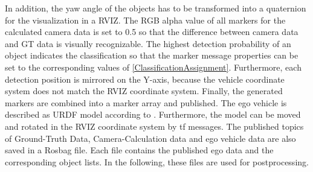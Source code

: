In addition, the yaw angle of the objects has to be transformed into a quaternion for the visualization in a \ac{RVIZ}. The RGB alpha value of all markers for the calculated camera data is set to 0.5 so that the difference between camera data and GT data is visually recognizable. 
The highest detection probability of an object indicates the classification so that the marker message properties can be set to the corresponding values of \cref{ClassificationAssignment}. Furthermore, each detection position is mirrored on the Y-axis, because the vehicle coordinate system does not match the \ac{RVIZ} coordinate system. Finally, the generated markers are combined into a marker array and published.
The ego vehicle is described as URDF model according to \cite{URDF}.
Furthermore, the model can be moved and rotated in the \ac{RVIZ} coordinate system by tf messages. 
The published topics of Ground-Truth Data, Camera-Calculation data and ego vehicle data are also saved in a Rosbag file. Each file contains the published ego data and the corresponding object lists. In the following, these files are used for postprocessing.